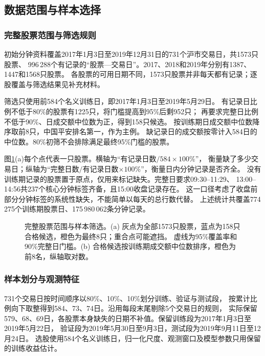 \subsection{数据范围与样本选择}\label{sec:data}
\subsubsection{完整股票范围与筛选规则}
初始分钟资料覆盖2017年1月3日至2019年12月31日的731个沪市交易日，共1573只股票、
996\,288个有记录的“股票—交易日”。2017、2018和2019年分别有1387、1447和1568只股票。
各股票的可用日期不同，1573只股票并非每天都有记录；逐股覆盖与筛选结果见补充材料。

筛选只使用前584个名义训练日，即2017年1月3日至2019年5月29日。
有记录日比例不低于80\%的股票有1225只，将门槛提高到95\%后剩952只；
再要求完整日比例不低于90\%、日成交额中位数为正，得到158只候选。
按训练期日成交额中位数降序取前8只，中国平安排名第一，作为主例。
缺记录日的成交额按零计入584日的中位数。80\%初筛不会排除满足最终95\%门槛的股票。

图\ref{fig:universe}(a)每个点代表一只股票。横轴为“有记录日数$/584\times100\%$”，
衡量缺了多少交易日；纵轴为“完整日数$/$有记录日数$\times100\%$”，衡量日内分钟记录是否齐全。
没有训练期记录的股票置于原点，仅用来标记缺失。完整日要求09:30--11:29、
13:00--14:56共237个核心分钟标签齐备，且15:00收盘记录存在。
这一口径考虑了收盘前部分分钟标签的系统性缺失，不能简单以每天的总行数代替。
上述统计共覆盖774\,275个训练期股票日、175\,980\,062条分钟记录。

\begin{figure}[!htbp]\centering
\caption{完整股票范围与样本筛选。(a) 灰点为全部1573只股票，蓝点为158只合格候选，橙色为最终8只；重合点可能遮挡。
虚线为95\%覆盖率和90\%完整日门槛。(b) 合格候选按训练期成交额中位数排序，橙色为前8名，纵轴取对数。}
\label{fig:universe}\end{figure}

\FloatBarrier

\subsubsection{样本划分与观测特征}
731个交易日按时间顺序以80\%、10\%、10\%划分训练、验证与测试段，
按累计比例向下取整得到584、73、74日。沿用每段末尾剔除5个交易日的规则，
实际保留579、68、69日，各股票本身缺失的日期不补值。保留训练段为2017年1月3日至2019年5月22日，
验证段为2019年5月30日至9月3日，测试段为2019年9月11日至12月24日。
选股使用584个名义训练日，归一化尺度、观测窗口及模型参数只用保留的训练收益估计。

